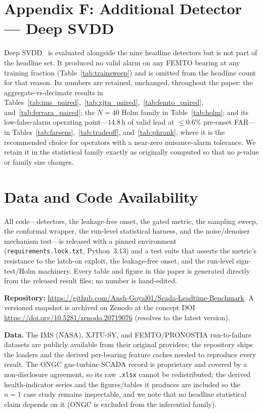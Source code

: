 \documentclass[journal]{IEEEtran}
\begin{document}
\section*{Appendix F: Additional Detector --- Deep SVDD}
Deep SVDD~\cite{ruff2018} is evaluated alongside the nine headline detectors but
is not part of the headline set. It produced no valid alarm on any FEMTO bearing
at any training fraction (Table~\ref{tab:trainsweep}) and is omitted from the
headline count for that reason. Its numbers are retained, unchanged, throughout
the paper: the aggregate-vs-decimate results in
Tables~\ref{tab:ims_paired},~\ref{tab:xjtu_paired},~\ref{tab:femto_paired},
and~\ref{tab:ferrara_paired}; the $N{=}40$ Holm family in Table~\ref{tab:holm};
and its low-false-alarm operating point---$14.8$\,h of valid lead at $\le0.6\%$
pre-onset FAR---in Tables~\ref{tab:farsens},~\ref{tab:tradeoff},
and~\ref{tab:phrank}, where it is the recommended choice for operators with a
near-zero nuisance-alarm tolerance. We retain it in the statistical family
exactly as originally computed so that no $p$-value or family size changes.


\section*{Data and Code Availability}
\label{sec:availability}
All code---detectors, the leakage-free onset, the gated metric, the sampling
sweep, the conformal wrapper, the run-level statistical harness, and the
noise/denoiser mechanism test---is released with a pinned environment
(\texttt{requirements.lock.txt}, Python~3.13) and a test suite that asserts the
metric's resistance to the latch-on exploit, the leakage-free onset, and the
run-level sign-test/Holm machinery. Every table and figure in this paper is
generated directly from the released result files; no number is hand-edited.

\noindent\textbf{Repository:}
\url{https://github.com/Ansh-Goyal01/Scada-Leadtime-Benchmark}. A versioned
snapshot is archived on Zenodo at the concept DOI
\url{https://doi.org/10.5281/zenodo.20719076} (resolves to the latest version).

\noindent\textbf{Data.} The IMS (NASA), XJTU-SY, and FEMTO/PRONOSTIA
run-to-failure datasets are publicly available from their original providers; the
repository ships the loaders and the derived per-bearing feature caches needed to
reproduce every result. The ONGC gas-turbine SCADA record is proprietary and
covered by a non-disclosure agreement, so its raw \texttt{.xlsx} cannot be
redistributed; the derived health-indicator series and the figures/tables it
produces are included so the $n{=}1$ case study remains inspectable, and we note
that no headline statistical claim depends on it (ONGC is excluded from the
inferential family).
\end{document}
